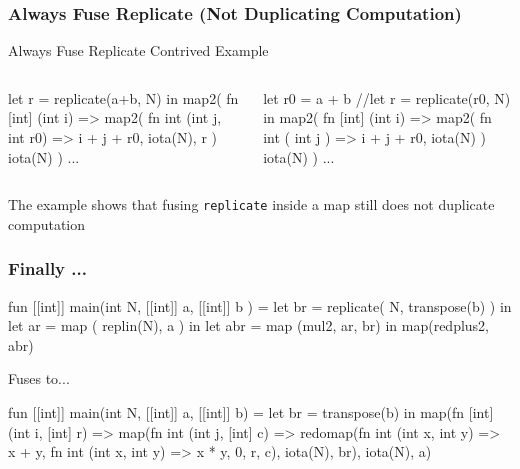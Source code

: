\documentclass{beamer}
\newcommand{\emp}[1]{\textcolor{DikuRed}{ #1}}
\begin{document}
\begin{frame}[fragile]
  \frametitle{Always Fuse Replicate (Not Duplicating Computation)}

\begin{block}{ Always Fuse Replicate Contrived Example }
\begin{columns}
\vspace{-2ex}
\begin{colorcode}[fontsize=\scriptsize]
let \emp{r} = replicate(a+b, N) in
map2( fn [int] (int i) =>
        map2( fn int (int j, int r0)
                 => i + j + \emp{r0},
              iota(N), \emp{r}
            )
      iota(N)
    ) ...
\end{colorcode}
\vspace{-2ex}
\begin{colorcode}[fontsize=\scriptsize]
let \emp{r0} = a + b
//let \emp{r}  = replicate(r0, N) in
map2( fn [int] (int i) =>
        map2( fn int ( int j )
                  => i + j + \emp{r0},
              iota(N)
            )
      iota(N)
    ) ...
\end{colorcode}
\end{columns}
\end{block}

\bigskip

The example shows that fusing {\tt replicate} \emp{inside} a map
still does not duplicate computation

\end{frame}

\begin{frame}[fragile,t]
  \frametitle{Finally ... }

\begin{colorcode}
fun [[int]] main(int N, [[int]] a, [[int]] b ) =
    let br  = replicate( N, transpose(b) ) in
    let ar  = map      ( replin(N),    a ) in
    let abr = map  (mul2, ar, br)      in
        map(redplus2, abr)
\end{colorcode}

Fuses to...

\begin{colorcode}
fun [[int]] main(int N, [[int]] a, [[int]] b) =
  let br = transpose(b) in
  map(fn [int] (int i, [int] r) =>
      map(fn int (int j, [int] c) =>
          redomap(fn int (int x, int y) => x + y,
                  fn int (int x, int y) => x * y,
                  0, r, c),
          iota(N), br),
      iota(N), a)
\end{colorcode}

\end{frame}
\end{document}
